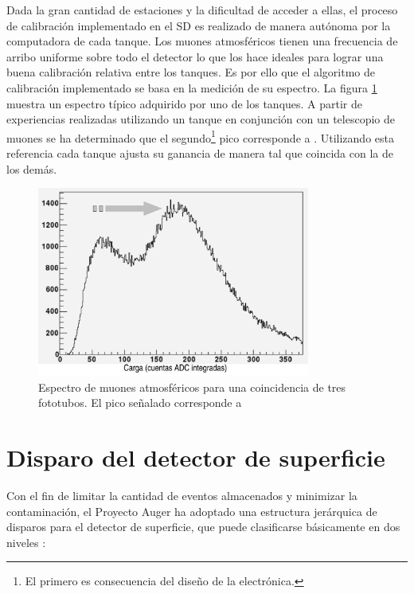 		Dada la gran cantidad de estaciones y la dificultad de acceder a ellas, el proceso de calibraci\'on implementado en el SD es realizado de manera aut\'onoma por la computadora de cada tanque. 
		Los muones atmosf\'ericos tienen una frecuencia de arribo uniforme sobre todo el detector lo que los hace ideales para lograr una buena calibraci\'on relativa entre los tanques. 
		Es por ello que el algoritmo de calibraci\'on implementado se basa en la medici\'on de su espectro. 
		La figura \ref{Calibracion_Muones} muestra un espectro t\'ipico adquirido por uno de los tanques. 
		A partir de experiencias realizadas utilizando un tanque en conjunci\'on con un telescopio de muones se ha determinado que el segundo\footnote{El primero es consecuencia del diseño de la electrónica.} pico corresponde a . 
		Utilizando esta referencia cada tanque ajusta su ganancia de manera tal que coincida con la de los dem\'as.
		
		\begin{figure}[ht]
			\begin{center}
			\includegraphics[width=0.8\textwidth]{fig/detectorAuger/vem}
			\caption{Espectro de muones atmosf\'ericos para una coincidencia de tres fototubos. El pico se\~nalado corresponde a }
			\label{Calibracion_Muones}
			\end{center}
		\end{figure}
		
		
		\section{Disparo del detector de superficie}
		\label{sbsc:trig_levels}
		
		Con el fin de limitar la cantidad de eventos almacenados y minimizar la contaminaci\'on, el Proyecto Auger ha adoptado una estructura jer\'arquica de disparos para el detector de superficie, que puede clasificarse b\'asicamente en dos niveles \cite{icrctri}:
		
